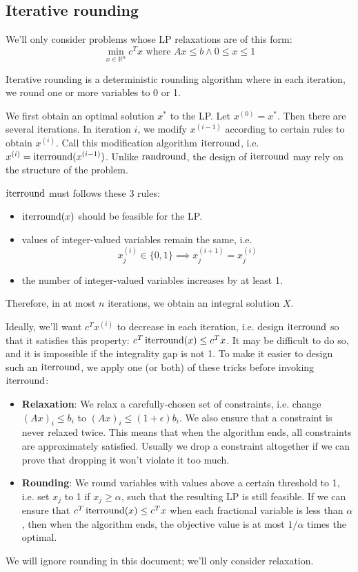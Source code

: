 \subsection{Iterative rounding}

We'll only consider problems whose LP relaxations are of this form:
\[ \min_{x \in \mathbb{R}^n} c^Tx \textrm{ where } Ax \le b \wedge 0 \le x \le 1 \]

Iterative rounding is a deterministic rounding algorithm
where in each iteration, we round one or more variables to 0 or 1.

We first obtain an optimal solution $x^*$ to the LP. Let $x^{(0)} = x^*$.
Then there are several iterations.
In iteration $i$, we modify $x^{(i-1)}$ according to certain rules to obtain $x^{(i)}$.
Call this modification algorithm $\operatorname{iterround}$, i.e. $x^{(i)} = \operatorname{iterround}(x^{(i-1)})$.
Unlike $\operatorname{randround}$, the design of $\operatorname{iterround}$ may rely on the structure of the problem.

$\operatorname{iterround}$ must follows these 3 rules:
\begin{itemize}
\item $\operatorname{iterround}(x)$ should be feasible for the LP.
\item values of integer-valued variables remain the same, i.e.
\[ x^{(i)}_j \in \{0, 1\} \implies x^{(i+1)}_j = x^{(i)}_j \]
\item the number of integer-valued variables increases by at least 1.
\end{itemize}
Therefore, in at most $n$ iterations, we obtain an integral solution $X$.

Ideally, we'll want $c^Tx^{(i)}$ to decrease in each iteration,
i.e. design $\operatorname{iterround}$ so that it satisfies this property: $c^T\operatorname{iterround}(x) \le c^Tx$.
It may be difficult to do so, and it is impossible if the integrality gap is not 1.
To make it easier to design such an $\operatorname{iterround}$,
we apply one (or both) of these tricks before invoking $\operatorname{iterround}$:
\begin{itemize}
\item \textbf{Relaxation}:
We relax a carefully-chosen set of constraints,
i.e. change $(Ax)_i \le b_i$ to $(Ax)_i \le (1+\epsilon)b_i$.
We also ensure that a constraint is never relaxed twice.
This means that when the algorithm ends, all constraints are approximately satisfied.
Usually we drop a constraint altogether if we can prove that
dropping it won't violate it too much.
\item \textbf{Rounding}:
We round variables with values above a certain threshold to 1,
i.e. set $x_j$ to 1 if $x_j \ge \alpha$, such that the resulting LP is still feasible.
If we can ensure that $c^T\operatorname{iterround}(x) \le c^Tx$ when each fractional variable
is less than $\alpha$, then when the algorithm ends,
the objective value is at most $1/\alpha$ times the optimal.
\end{itemize}
We will ignore rounding in this document; we'll only consider relaxation.

